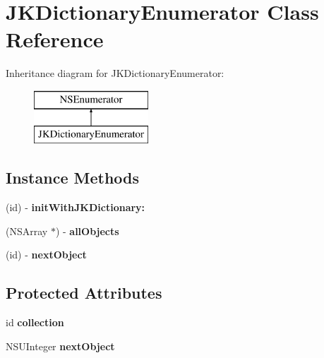 \hypertarget{interface_j_k_dictionary_enumerator}{\section{J\-K\-Dictionary\-Enumerator Class Reference}
\label{interface_j_k_dictionary_enumerator}
}
Inheritance diagram for J\-K\-Dictionary\-Enumerator\-:\begin{figure}[H]
\begin{center}
\leavevmode
\includegraphics[height=2.000000cm]{interface_j_k_dictionary_enumerator}
\end{center}
\end{figure}
\subsection*{Instance Methods}
\begin{DoxyCompactItemize}
\item 
\hypertarget{interface_j_k_dictionary_enumerator_a5498b1645dccafb95c3573967f145b44}{(id) -\/ {\bfseries init\-With\-J\-K\-Dictionary\-:}}\label{interface_j_k_dictionary_enumerator_a5498b1645dccafb95c3573967f145b44}

\item 
\hypertarget{interface_j_k_dictionary_enumerator_ad5cc23dd2f1b12fd146dd5a2c4c99ca7}{(N\-S\-Array $\ast$) -\/ {\bfseries all\-Objects}}\label{interface_j_k_dictionary_enumerator_ad5cc23dd2f1b12fd146dd5a2c4c99ca7}

\item 
\hypertarget{interface_j_k_dictionary_enumerator_a22e6adbaeee0f87104eb260b5d11ecaf}{(id) -\/ {\bfseries next\-Object}}\label{interface_j_k_dictionary_enumerator_a22e6adbaeee0f87104eb260b5d11ecaf}

\end{DoxyCompactItemize}
\subsection*{Protected Attributes}
\begin{DoxyCompactItemize}
\item 
\hypertarget{interface_j_k_dictionary_enumerator_a66fa5d24f0bd93caee4184fd5e5990c4}{id {\bfseries collection}}\label{interface_j_k_dictionary_enumerator_a66fa5d24f0bd93caee4184fd5e5990c4}

\item 
\hypertarget{interface_j_k_dictionary_enumerator_a29ad430dcc0173475b67f81a5f92abc0}{N\-S\-U\-Integer {\bfseries next\-Object}}\label{interface_j_k_dictionary_enumerator_a29ad430dcc0173475b67f81a5f92abc0}

\end{DoxyCompactItemize}


